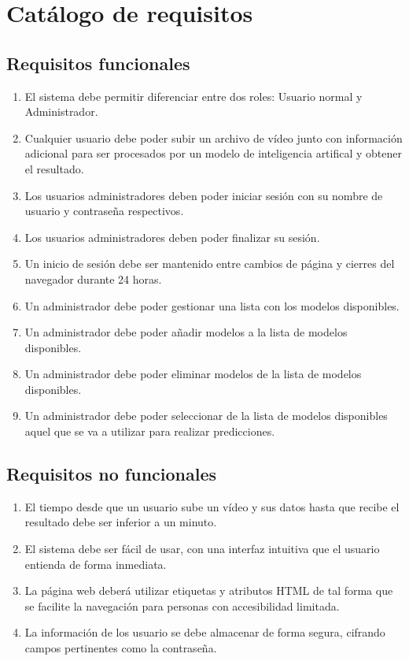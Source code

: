 \section{Catálogo de requisitos}

\subsection{Requisitos funcionales}

\begin{enumerate}[start=1,label={\bfseries RF\arabic*:}]
    \item El sistema debe permitir diferenciar entre dos roles: Usuario normal y
          Administrador.
    \item Cualquier usuario debe poder subir un archivo de vídeo junto con
          información adicional para ser procesados por un modelo de
          inteligencia artifical y obtener el resultado.
    \item Los usuarios administradores deben poder iniciar sesión con su nombre
          de usuario y contraseña respectivos.
    \item Los usuarios administradores deben poder finalizar su sesión.
    \item Un inicio de sesión debe ser mantenido entre cambios de página y
          cierres del navegador durante 24 horas.
    \item Un administrador debe poder gestionar una lista con los modelos
          disponibles.
    \item Un administrador debe poder añadir modelos a la lista de modelos
          disponibles.
    \item Un administrador debe poder eliminar modelos de la lista de modelos
          disponibles.
    \item Un administrador debe poder seleccionar de la lista de modelos
          disponibles aquel que se va a utilizar para realizar predicciones.
\end{enumerate}

\subsection{Requisitos no funcionales}

\begin{enumerate}[start=1,label={\bfseries RNF\arabic*:}]
    \item El tiempo desde que un usuario sube un vídeo y sus datos hasta que
          recibe el resultado debe ser inferior a un minuto.
    \item El sistema debe ser fácil de usar, con una interfaz intuitiva que el
          usuario entienda de forma inmediata.
    \item La página web deberá utilizar etiquetas y atributos HTML de tal forma
          que se facilite la navegación para personas con accesibilidad
          limitada.
    \item La información de los usuario se debe almacenar de forma segura,
          cifrando campos pertinentes como la contraseña.
\end{enumerate}

